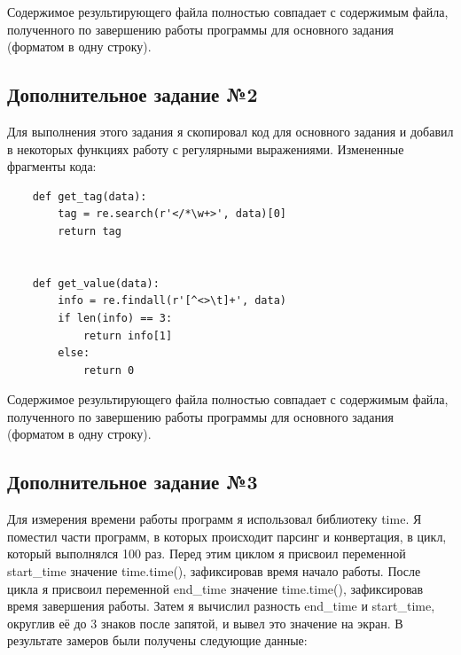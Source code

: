 \documentclass[12pt]{article}
\begin{document}
Содержимое результирующего файла полностью совпадает с содержимым файла, полученного по завершению работы программы для основного задания (форматом в одну строку).

\subsection{Дополнительное задание №2}

Для выполнения этого задания я скопировал код для основного задания и добавил в некоторых функциях работу с регулярными выражениями. Измененные фрагменты кода:

\begin{verbatim}
    def get_tag(data):
        tag = re.search(r'</*\w+>', data)[0]
        return tag
    
    
    def get_value(data):
        info = re.findall(r'[^<>\t]+', data)
        if len(info) == 3:
            return info[1]
        else:
            return 0
\end{verbatim}

Содержимое результирующего файла полностью совпадает с содержимым файла, полученного по завершению работы программы для основного задания (форматом в одну строку).

\newpage

\subsection{Дополнительное задание №3}

Для измерения времени работы программ я использовал библиотеку time. Я поместил части программ, в которых происходит парсинг и конвертация, в цикл, который выполнялся 100 раз. Перед этим циклом я присвоил переменной start\_time значение time.time(), зафиксировав время начало работы. После цикла я присвоил переменной end\_time значение time.time(), зафиксировав время завершения работы. Затем я вычислил разность end\_time и start\_time, округлив её до 3 знаков после запятой, и вывел это значение на экран. В результате замеров были получены следующие данные:\\
\end{document}
